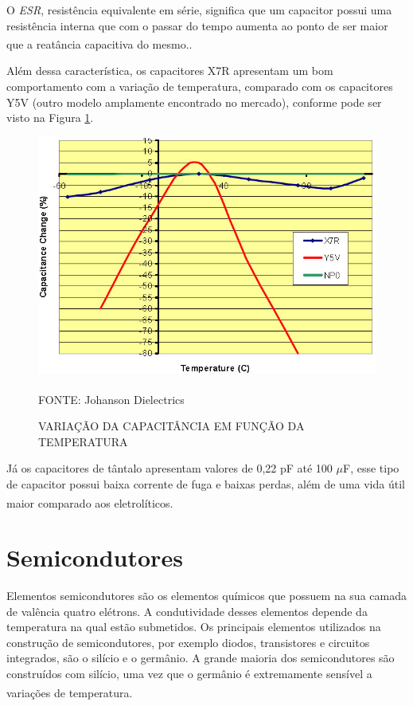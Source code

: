 \documentclass[
	12pt,				%
	openright,			%
	oneside,			%
	a4paper,			%
	english,			%
	french,				%
	spanish,			%
	brazil,				%
	oldfontcommands
	]{abntex2}
\begin{document}
	O \textit{ESR}, resistência equivalente em série, significa que um capacitor possui uma resistência interna que com o passar do tempo aumenta ao ponto de ser maior que a reatância capacitiva do mesmo.\textsuperscript{\cite{esr}}.
		
	Além dessa característica, os capacitores X7R apresentam um bom comportamento com a variação de temperatura, comparado com os capacitores Y5V (outro modelo amplamente encontrado no mercado), conforme pode ser visto na Figura \ref{Fig_Cap_Temp}.
	
	\begin{figure}[th]
		\caption{VARIAÇÃO DA CAPACITÂNCIA EM FUNÇÃO DA TEMPERATURA}
		\label{Fig_Cap_Temp}
		\centering
		\includegraphics[width=0.8\linewidth]{./figs/y5v}
			
		\begin{small}
			FONTE: Johanson Dielectrics\textsuperscript{\cite{y5v}}
		\end{small}		
	\end{figure}

	Já os capacitores de tântalo apresentam valores de 0,22 pF até 100 $\mu$F, esse tipo de capacitor possui baixa corrente de fuga e baixas perdas, além de uma vida útil maior comparado aos eletrolíticos.\textsuperscript{\cite{x7r}}

\section[Semicondutores]{Semicondutores}

Elementos semicondutores são os elementos químicos que possuem na sua camada de valência quatro elétrons. A condutividade desses elementos depende da temperatura na qual estão submetidos. Os principais elementos utilizados na construção de semicondutores, por exemplo diodos, transistores e circuitos integrados, são o silício e o germânio. A grande maioria dos semicondutores são construídos com silício, uma vez que o germânio é extremamente sensível a variações de temperatura.\textsuperscript{\cite{semicondutores}}
	
\end{document}
